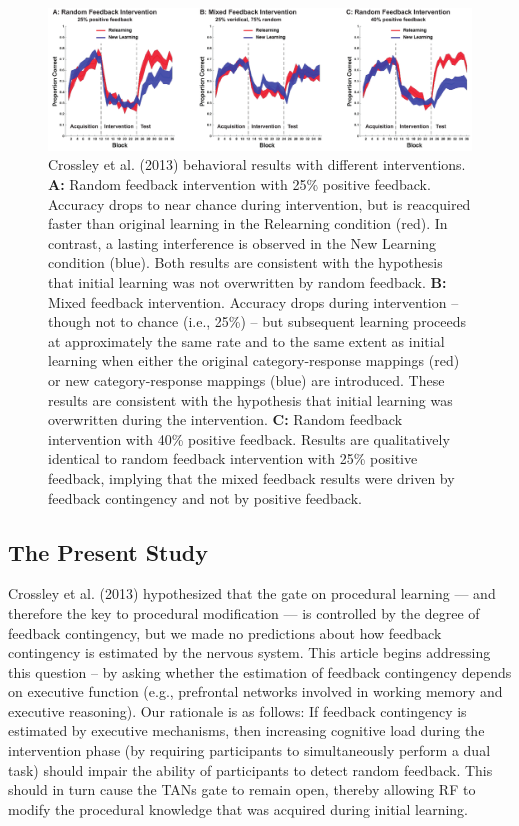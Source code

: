 \documentclass[apacite,draftfirst,man]{apa6}
\begin{document}
\begin{figure}[h]
\centering \includegraphics[width=1.0\textwidth]{../figures/fig_unlearning_results.pdf}
\caption{Crossley et al. (2013) behavioral results with different
  interventions. \textbf{A:} Random feedback intervention with 25\% positive
  feedback. Accuracy drops to near chance during intervention, but is reacquired
  faster than original learning in the Relearning condition (red). In contrast, a
  lasting interference is observed in the New Learning condition (blue). Both
  results are consistent with the hypothesis that initial learning was not
  overwritten by random feedback. \textbf{B:} Mixed feedback intervention.
  Accuracy drops during intervention -- though not to chance (i.e., 25\%) -- but
  subsequent learning proceeds at approximately the same rate and to the same
  extent as initial learning when either the original category-response mappings
  (red) or new category-response mappings (blue) are introduced. These results are
  consistent with the hypothesis that initial learning was overwritten during the
  intervention. \textbf{C:} Random feedback intervention with 40\% positive
  feedback. Results are qualitatively identical to random feedback intervention
  with 25\% positive feedback, implying that the mixed feedback results were
  driven by feedback contingency and not by positive feedback. }
  \label{fig:unlearning_data}
\end{figure}

\subsection*{The Present Study}
Crossley et al. (2013) hypothesized that the gate on procedural learning --- and
therefore the key to procedural modification --- is controlled by the degree of
feedback contingency, but we made no predictions about how feedback contingency
is estimated by the nervous system. This article begins addressing this question
-- by asking whether the estimation of feedback contingency depends on executive
function (e.g., prefrontal networks involved in working memory and executive
reasoning). Our rationale is as follows: If feedback contingency is estimated by
executive mechanisms, then increasing cognitive load during the intervention
phase (by requiring participants to simultaneously perform a dual task) should
impair the ability of participants to detect random feedback. This should in
turn cause the TANs gate to remain open, thereby allowing RF to modify the
procedural knowledge that was acquired during initial learning.
\end{document}
